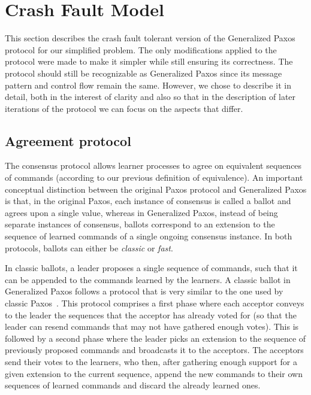 \section{Crash Fault Model} \label{Crash Fault Model}

This section describes the crash fault tolerant version of the Generalized Paxos protocol for our simplified problem. The only modifications applied to the protocol were made to make it simpler while still ensuring its correctness. The protocol should still be recognizable as Generalized Paxos since its message pattern and control flow remain the same. However, we chose to describe it in detail, both in the interest of clarity and also so that in the description of later iterations of the protocol we can focus on the aspects that differ. 

\subsection{Agreement protocol} 

The consensus protocol allows learner processes to agree on equivalent sequences of commands (according to our previous definition of equivalence).
An important conceptual distinction between the original Paxos protocol and Generalized Paxos is that, in the original Paxos, each instance of consensus is called a ballot and agrees upon a single value, whereas in Generalized Paxos, instead of being separate instances of consensus, ballots correspond to an extension to the sequence of learned commands of a single ongoing consensus instance.
In both protocols, ballots can either be \textit{classic} or \textit{fast}. \par

In classic ballots, a leader proposes a single sequence of commands, such that it can be appended to the commands learned by the learners. 
A classic ballot in Generalized Paxos follows a protocol that is very similar to the one used by classic Paxos~\cite{Lam98}. This protocol comprises a first phase where each acceptor conveys to the leader the sequences that the acceptor has already voted for (so that the leader can resend commands that may not have gathered enough votes).
This is followed by a second phase where the leader picks an extension to the sequence of previously proposed commands and broadcasts it to the acceptors. The acceptors send their votes to the learners, who then, after gathering enough support for a given extension to the current sequence, append the new commands to their own sequences of learned commands and discard the already learned ones.\par

